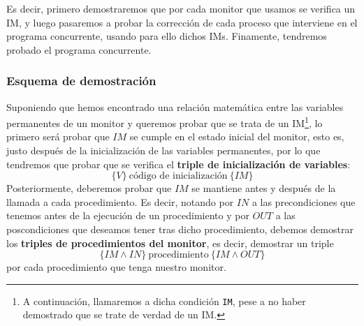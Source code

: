 Es decir, primero demostraremos que por cada monitor que usamos se verifica un IM, y luego pasaremos a probar la corrección de cada proceso que interviene en el programa concurrente, usando para ello dichos IMs. Finamente, tendremos probado el programa concurrente.

\subsubsection{Esquema de demostración}
Suponiendo que hemos encontrado una relación matemática entre las variables permanentes de un monitor y queremos probar que se trata de un IM\footnote{A continuación, llamaremos a dicha condición \texttt{IM}, pese a no haber demostrado que se trate de verdad de un IM.}, lo primero será probar que $IM$ se cumple en el estado inicial del monitor, esto es, justo después de la inicialización de las variables permanentes, por lo que tendremos que probar que se verifica el \textbf{triple de inicialización de variables}:
\begin{equation*}
    \{V\}\ \text{código de inicialización}\ \{IM\}
\end{equation*}
Posteriormente, deberemos probar que $IM$ se mantiene antes y después de la llamada a cada procedimiento. Es decir, notando por $IN$ a las precondiciones que tenemos antes de la ejecución de un procedimiento y por $OUT$ a las poscondiciones que deseamos tener tras dicho procedimiento, debemos demostrar los \textbf{triples de procedimientos del monitor}, es decir, demostrar un triple
\begin{equation*}
    \{IM \land IN\}\ \text{procedimiento}\ \{IM \land OUT\}
\end{equation*}
por cada procedimiento que tenga nuestro monitor.

